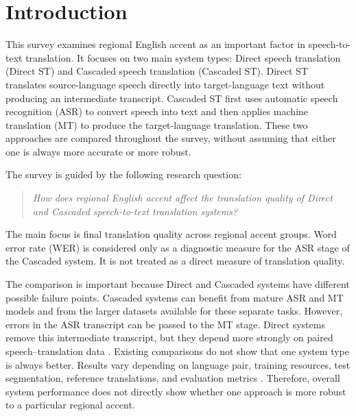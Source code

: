 \section{Introduction}
\label{sec:introduction}

This survey examines regional English accent as an important factor in
speech-to-text translation. It focuses on two main system types: Direct speech
translation (Direct ST) and Cascaded speech translation (Cascaded ST). Direct
ST translates source-language speech directly into target-language text
without producing an intermediate transcript. Cascaded ST first uses automatic
speech recognition (ASR) to convert speech into text and then applies machine
translation (MT) to produce the target-language translation. These two
approaches are compared throughout the survey, without assuming that either
one is always more accurate or more robust.

The survey is guided by the following research question:
\begin{quote}
\emph{How does regional English accent affect the translation quality of
Direct and Cascaded speech-to-text translation systems?}
\end{quote}
The main focus is final translation quality across regional accent groups.
Word error rate (WER) is considered only as a diagnostic measure for the ASR
stage of the Cascaded system. It is not treated as a direct measure of
translation quality.

The comparison is important because Direct and Cascaded systems have different
possible failure points. Cascaded systems can benefit from mature ASR and MT
models and from the larger datasets available for these separate tasks.
However, errors in the ASR transcript can be passed to the MT stage. Direct
systems remove this intermediate transcript, but they depend more strongly on
paired speech--translation data \cite{sperber2020endtoend}. Existing
comparisons do not show that one system type is always better. Results vary
depending on language pair, training resources, test segmentation, reference
translations, and evaluation metrics
\cite{bentivogli2021cascade,anastasopoulos2021iwslt,
etchegoyhen2022casestudy}. Therefore, overall system performance does not
directly show whether one approach is more robust to a particular regional
accent.

